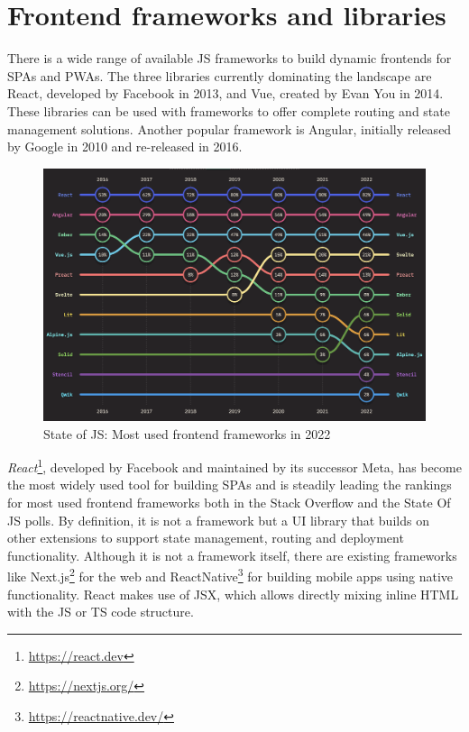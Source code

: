 \section{Frontend frameworks and libraries}

There is a wide range of available \ac{JS} frameworks to build dynamic frontends for \ac{SPA}s and \ac{PWA}s. The three libraries currently dominating the landscape are React, developed by Facebook in 2013, and Vue, created by Evan You in 2014. These libraries can be used with frameworks to offer complete routing and state management solutions. Another popular framework is Angular, initially released by Google in 2010 and re-released in 2016.

\begin{figure}[h]
    \centering
    \includegraphics[scale=0.4]{04_Artefakte/01_Abbildungen/stateofjs-usage-frontend-frameworks-2022}
    \caption[Most used frontend frameworks in 2022]{State of JS: Most used frontend frameworks in 2022 \parencite{mostUsedFrontendFrameworks22}\protect}
    \label{fig:mostUsedFrameworks}
\end{figure}

\emph{React}\footnote{\url{https://react.dev}}, developed by Facebook and maintained by its successor Meta, has become the most widely used tool for building \ac{SPA}s and is steadily leading the rankings for most used frontend frameworks both in the Stack Overflow \parencite{stackOverflowPollWebFrameworks23} and the State Of JS \parencite{mostUsedFrontendFrameworks22} polls. By definition, it is not a framework but a \ac{UI} library that builds on other extensions to support state management, routing and deployment functionality. Although it is not a framework itself, there are existing frameworks like Next.js\footnote{\url{https://nextjs.org/}} for the web and ReactNative\footnote{\url{https://reactnative.dev/}} for building mobile apps using native functionality. React makes use of \ac{JSX}, which allows directly mixing inline \ac{HTML} with the \ac{JS} or \ac{TS} code structure.

